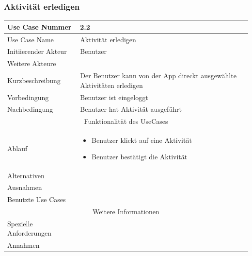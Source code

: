 \documentclass[10pt,a4paper]{article}
\begin{document}
\subsubsection{Aktivit\"at erledigen}
		\begin{tabular}{|l|p{.5\linewidth}|}
		\hline Use Case Nummer & 2.2 \\ 
		\hline Use Case Name & Aktivit\"at erledigen \\ 
		\hline Initiierender Akteur & Benutzer \\
		\hline Weitere Akteure &  \\
		\hline Kurzbeschreibung & Der Benutzer kann von der App direckt ausgew\"ahlte Aktivit\"aten erledigen \\
		\hline Vorbedingung & Benutzer ist eingeloggt \\
		\hline Nachbedingung & Benutzer hat Aktivit\"at ausgef\"uhrt \\
		\hline \multicolumn{2}{|c|}{Funktionalität des UseCases}\\
		\hline Ablauf & \begin{itemize}
			\item Benutzer klickt auf eine Aktivit\"at
			\item Benutzer best\"atigt die Aktivit\"at
		\end{itemize} \\
		\hline Alternativen &  \\
		\hline Ausnahmen &  \\
		\hline Benutzte Use Cases &  \\
		\hline \multicolumn{2}{|c|}{Weitere Informationen} \\
		\hline Spezielle Anforderungen &  \\
		\hline Annahmen &  \\
		\hline
		\end{tabular}
\end{document}
